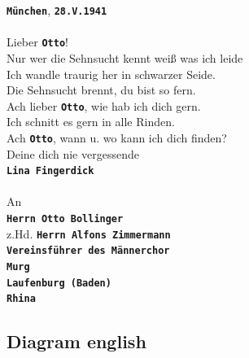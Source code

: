 \documentclass[12pt, a4paper, ngerman, bidi=default]{article}
\begin{document}
\begin{tcolorbox}[colback=oldLetter, colframe=black, sharp corners, width=\textwidth]
\textbf{\colorbox{place}{\texttt{München}}}, \textbf{\colorbox{date}{\texttt{28.V.1941}}} \\
\\
Lieber \textbf{\colorbox{person}{\texttt{Otto}}}!\\
Nur wer die Sehnsucht kennt weiß was ich leide\\
Ich wandle traurig her in schwarzer Seide.\\
Die Sehnsucht brennt, du bist so fern.\\
Ach lieber \textbf{\colorbox{person}{\texttt{Otto}}}, wie hab ich dich gern.\\
Ich schnitt es gern in alle Rinden.\\
Ach \textbf{\colorbox{person}{\texttt{Otto}}}, wann u. wo kann ich dich finden?\\
Deine dich nie vergessende\\
\textbf{\colorbox{person}{\texttt{Lina Fingerdick}}}\\
\\
An\\
\textbf{\colorbox{person}{\texttt{Herrn Otto Bollinger}}}\\
z.Hd. \textbf{\colorbox{person}{\texttt{Herrn Alfons Zimmermann}}}\\
\textbf{\colorbox{organization}{\texttt{Vereinsführer des Männerchor}}}\\
\textbf{\colorbox{place}{\texttt{Murg}}}\\
\textbf{\colorbox{place}{\texttt{Laufenburg (Baden)}}}\\
\textbf{\colorbox{place}{\texttt{Rhina}}}
\end{tcolorbox}




\subsection{Diagram english}

\vspace{6\baselineskip}
\end{document}
